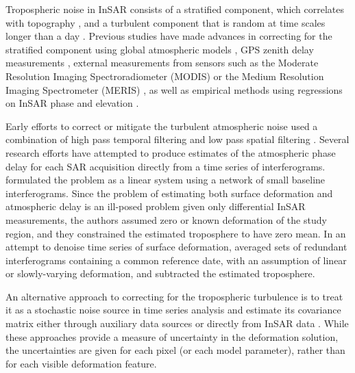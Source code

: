 \documentclass{utexasthesis}
\begin{document}
Tropospheric noise in InSAR consists of a stratified component, which correlates with topography \citep{Doin2009CorrectionsStratifiedTropospheric}, and a turbulent component that is random at time scales longer than a day \citep{Emardson2003NeutralAtmosphericDelay, Onn2006ModelingWaterVapor}. Previous studies have made advances in correcting for the stratified component using global atmospheric models \citep{Doin2009CorrectionsStratifiedTropospheric, Jolivet2014ImprovingInsarGeodesy, Cao2021AdvancedInsarTropospheric}, GPS zenith delay measurements \citep{Onn2006ModelingWaterVapor}, external measurements from sensors such as the Moderate Resolution Imaging Spectroradiometer (MODIS) \citep{Li2005InterferometricSyntheticAperture, Barnhart2013CharacterizingEstimatingNoise} or the Medium Resolution Imaging Spectrometer (MERIS)  \citep{Ding2008AtmosphericEffectsInsar}, as well as empirical methods using regressions on InSAR phase and elevation \citep{Zebker2021AccuracyModelFree, Murray2021ClusterBasedEmpirical}.

Early efforts to correct or mitigate the turbulent atmospheric noise used a combination of high pass temporal filtering and low pass spatial filtering \citep{Ferretti2001PermanentScatterersSar, Berardino2002NewAlgorithmSurface}.
Several research efforts have attempted to produce estimates of the atmospheric phase delay for each SAR acquisition directly from a time series of interferograms. \citep{Liu2012SatelliteRadarInterferometry} formulated the problem as a linear system using a network of small baseline interferograms. Since the problem of estimating both surface deformation and atmospheric delay is an ill-posed problem given only differential InSAR measurements, the authors assumed zero or known deformation of the study region, and they constrained the estimated troposphere to have zero mean. In an attempt to denoise time series of surface deformation, \citep{Tymofyeyeva2015MitigationAtmosphericPhase} averaged sets of redundant interferograms containing a common reference date, with an assumption of linear or slowly-varying deformation, and subtracted the estimated troposphere.

An alternative approach to correcting for the tropospheric turbulence is to treat it as a stochastic noise source in time series analysis \citep{Simons2007InterferometricSyntheticAperture, Agram2015NoiseModelInsar} and estimate its covariance matrix either through auxiliary data sources \citep{Barnhart2013CharacterizingEstimatingNoise, Parker2015SystematicAssessmentAtmospheric} or directly from InSAR data \citep{Lohman2005SomeThoughtsUse}. While these approaches provide a measure of uncertainty in the deformation solution, the uncertainties are given for each pixel (or each model parameter), rather than for each visible deformation feature.
\end{document}
